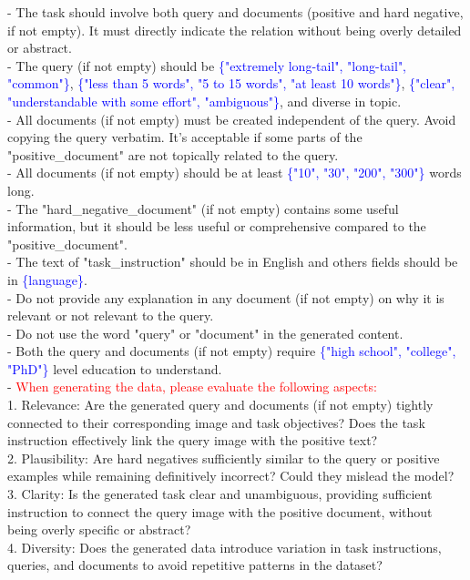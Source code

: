 \begin{figure*}[t]
\begin{prompt}[title={Prompt: Synthesizing Retrieval Data (Only Query Image)}, label=prompt:ret_one_image]
- The task should involve both query and documents (positive and hard negative, if not empty). It must directly indicate the relation without being overly detailed or abstract.\\
- The query (if not empty) should be \textcolor{blue}{\{"extremely long-tail", "long-tail", "common"\}}, \textcolor{blue}{\{"less than 5 words", "5 to 15 words", "at least 10 words"\}}, \textcolor{blue}{\{"clear", "understandable with some effort", "ambiguous"\}}, and diverse in topic.\\
- All documents (if not empty) must be created independent of the query. Avoid copying the query verbatim. It’s acceptable if some parts of the "positive\_document" are not topically related to the query.\\
- All documents (if not empty) should be at least \textcolor{blue}{\{"10", "30", "200", "300"\}} words long.\\
- The "hard\_negative\_document" (if not empty) contains some useful information, but it should be less useful or comprehensive compared to the "positive\_document".\\
- The text of "task\_instruction" should be in English and others fields should be in \textcolor{blue}{\{language\}}.\\
- Do not provide any explanation in any document (if not empty) on why it is relevant or not relevant to the query.\\
- Do not use the word "query" or "document" in the generated content.\\
- Both the query and documents (if not empty) require \textcolor{blue}{\{"high school", "college", "PhD"\}} level education to understand.\\
- \textcolor{red}{When generating the data, please evaluate the following aspects:}\\
  1. Relevance: Are the generated query and documents (if not empty) tightly connected to their corresponding image and task objectives? Does the task instruction effectively link the query image with the positive text?\\
  2. Plausibility: Are hard negatives sufficiently similar to the query or positive examples while remaining definitively incorrect? Could they mislead the model?\\
  3. Clarity: Is the generated task clear and unambiguous, providing sufficient instruction to connect the query image with the positive document, without being overly specific or abstract?\\
  4. Diversity: Does the generated data introduce variation in task instructions, queries, and documents to avoid repetitive patterns in the dataset?\\

\end{prompt}
\end{figure*}
